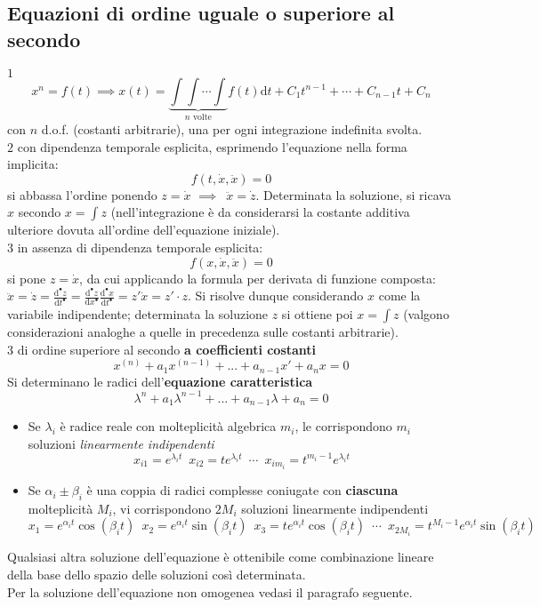 \documentclass[10pt]{article}
\theoremstyle{plain}
\begin{document}
\subsection{Equazioni di ordine uguale o superiore al secondo}
$\boxed{1}$
\[x^n = f(t) \implies x(t) = \underbrace{\int \int \cdots \int}_{n \textrm{ volte}} f(t)\textrm{d}t + C_1 t^{n-1} + \cdots + C_{n-1} t + C_n\]
con $n$ d.o.f. (costanti arbitrarie), una per ogni integrazione indefinita svolta.
\\$\boxed{2}$ con dipendenza temporale esplicita, esprimendo l'equazione nella forma implicita:
\[f(t, \dot x, \ddot x) = 0\]
si abbassa l'ordine ponendo $z = \dot x$ $\implies \enspace \ddot x = \dot z$. Determinata la soluzione, si ricava $x$ secondo $x = \int z$ (nell'integrazione è da considerarsi la costante additiva ulteriore dovuta all'ordine dell'equazione iniziale).
\\$\boxed{3}$ in assenza di dipendenza temporale esplicita:
\[f(x, \dot x, \ddot x) = 0\]
si pone $z = \dot x$, da cui applicando la formula per derivata di funzione composta: $\displaystyle \ddot x = \dot z = \frac{\textrm{d}^{•} z}{\textrm{d}t^{•}} = \frac{\textrm{d}^{•} z}{\textrm{d}x^{•}} \frac{\textrm{d}^{•} x}{\textrm{d}t^{•}} = z' \dot x = z' \cdot z$. Si risolve dunque considerando $x$ come la variabile indipendente; determinata la soluzione $z$ si ottiene poi $x = \int z$ (valgono considerazioni analoghe a quelle in precedenza sulle costanti arbitrarie).
\\$\boxed{3}$ di ordine superiore al secondo \textbf{a coefficienti costanti}
\[x^{(n)} + a_1 x^{(n-1)} + ... + a_{n-1} x' + a_n x = 0\]
Si determinano le radici dell'\textbf{equazione caratteristica}
\[\lambda^n + a_1 \lambda^{n-1} + ... + a_{n-1} \lambda + a_n = 0\]
\begin{itemize}
\item Se $\lambda_i$ è radice reale con molteplicità algebrica $m_i$, le corrispondono $m_i$ soluzioni \textit{linearmente indipendenti} \[x_{i1} = e^{\lambda_i t} \enspace x_{i2} = t e^{\lambda_i t}\enspace \cdots\enspace  x_{im_i} = t^{m_i - 1}e^{\lambda_i t}\]
\item Se $\alpha_i \pm \beta_i$ è una coppia di radici complesse coniugate con \textbf{ciascuna} molteplicità $M_i$, vi corrispondono $2M_i$ soluzioni linearmente indipendenti
\[x_1 = e^{\alpha_i t}\cos(\beta_i t) \enspace x_2 = e^{\alpha_i t}\sin(\beta_i t) \enspace x_3 = t e^{\alpha_i t}\cos(\beta_i t) \enspace \cdots \enspace x_{2M_i} = t^{M_i - 1}e^{\alpha_i t}\sin(\beta_i t)\]
\end{itemize}
Qualsiasi altra soluzione dell'equazione è ottenibile come combinazione lineare della base dello spazio delle soluzioni così determinata.
\\Per la soluzione dell'equazione non omogenea vedasi il paragrafo seguente.
\end{document}
